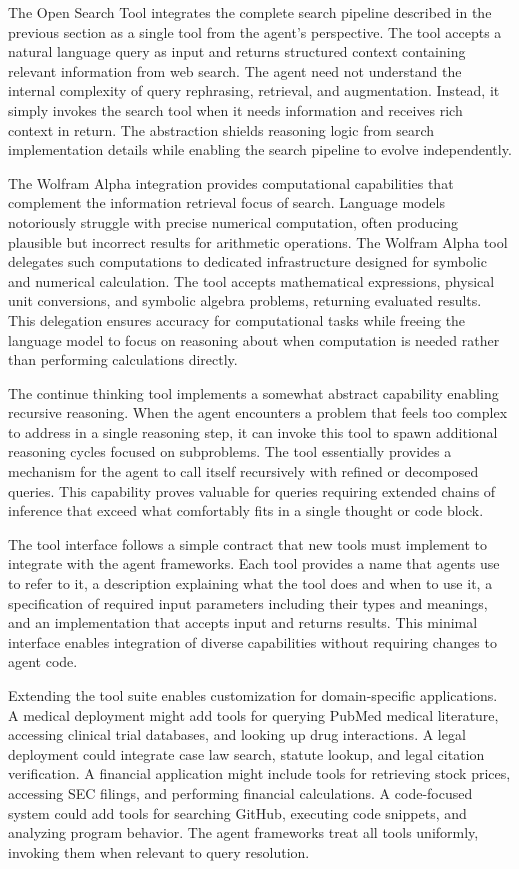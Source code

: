 The Open Search Tool integrates the complete search pipeline described in the previous section as a single tool from the agent's perspective. The tool accepts a natural language query as input and returns structured context containing relevant information from web search. The agent need not understand the internal complexity of query rephrasing, retrieval, and augmentation. Instead, it simply invokes the search tool when it needs information and receives rich context in return. The abstraction shields reasoning logic from search implementation details while enabling the search pipeline to evolve independently.

The Wolfram Alpha integration provides computational capabilities that complement the information retrieval focus of search. Language models notoriously struggle with precise numerical computation, often producing plausible but incorrect results for arithmetic operations. The Wolfram Alpha tool delegates such computations to dedicated infrastructure designed for symbolic and numerical calculation. The tool accepts mathematical expressions, physical unit conversions, and symbolic algebra problems, returning evaluated results. This delegation ensures accuracy for computational tasks while freeing the language model to focus on reasoning about when computation is needed rather than performing calculations directly.

The continue thinking tool implements a somewhat abstract capability enabling recursive reasoning. When the agent encounters a problem that feels too complex to address in a single reasoning step, it can invoke this tool to spawn additional reasoning cycles focused on subproblems. The tool essentially provides a mechanism for the agent to call itself recursively with refined or decomposed queries. This capability proves valuable for queries requiring extended chains of inference that exceed what comfortably fits in a single thought or code block.

The tool interface follows a simple contract that new tools must implement to integrate with the agent frameworks. Each tool provides a name that agents use to refer to it, a description explaining what the tool does and when to use it, a specification of required input parameters including their types and meanings, and an implementation that accepts input and returns results. This minimal interface enables integration of diverse capabilities without requiring changes to agent code.

Extending the tool suite enables customization for domain-specific applications. A medical deployment might add tools for querying PubMed medical literature, accessing clinical trial databases, and looking up drug interactions. A legal deployment could integrate case law search, statute lookup, and legal citation verification. A financial application might include tools for retrieving stock prices, accessing SEC filings, and performing financial calculations. A code-focused system could add tools for searching GitHub, executing code snippets, and analyzing program behavior. The agent frameworks treat all tools uniformly, invoking them when relevant to query resolution.

